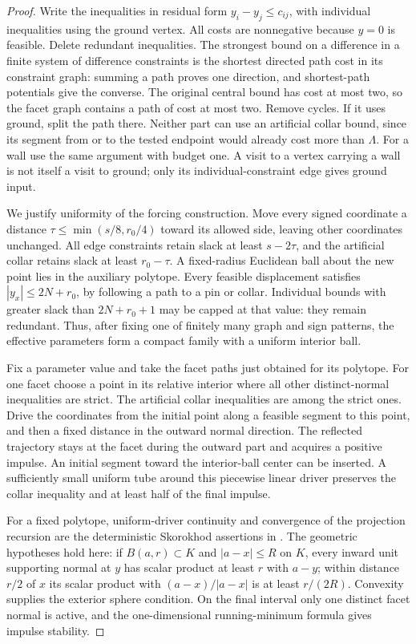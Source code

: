 \begin{proof}
Write the inequalities in residual form $y_i-y_j\le c_{ij}$, with
individual inequalities using the ground vertex. All costs are
nonnegative because $y=0$ is feasible. Delete redundant inequalities.
The strongest bound on a difference in a finite system of difference
constraints is the shortest directed path cost in its constraint graph:
summing a path proves one direction, and shortest-path potentials give
the converse. The original central bound has cost at most two, so the
facet graph contains a path of cost at most two. Remove cycles. If it
uses ground, split the path there. Neither part can use an artificial
collar bound, since its segment from or to the tested endpoint would
already cost more than $\Lambda$. For a wall use the same argument
with budget one. A visit to a vertex carrying a wall is not itself a
visit to ground; only its individual-constraint edge gives ground input.

We justify uniformity of the forcing construction. Move every signed
coordinate a distance $\tau\le\min(s/8,r_0/4)$ toward its allowed side,
leaving other coordinates unchanged. All edge constraints retain slack
at least $s-2\tau$, and the artificial collar retains slack at least
$r_0-\tau$. A fixed-radius Euclidean ball about the new point lies in
the auxiliary polytope. Every feasible displacement satisfies
$|y_x|\le2N+r_0$, by following a path to a pin or collar. Individual
bounds with greater slack than $2N+r_0+1$ may be capped at that value:
they remain redundant. Thus, after fixing one of finitely many graph
and sign patterns, the effective parameters form a compact family
with a uniform interior ball.

Fix a parameter value and take the facet paths just obtained for its
polytope. For one facet choose a point in its relative interior where
all other distinct-normal inequalities are strict. The artificial
collar inequalities are among the strict ones. Drive the coordinates
from the initial point along a feasible segment to this point, and
then a fixed distance in the outward normal direction. The reflected
trajectory stays at the facet during the outward part and acquires
a positive impulse. An initial segment toward the interior-ball
center can be inserted. A sufficiently small uniform tube around
this piecewise linear driver preserves the collar inequality and at
least half of the final impulse.

For a fixed polytope, uniform-driver continuity and convergence of the
projection recursion are the deterministic Skorokhod assertions in
\cite[Section 2, Corollaries 3--4]{Slominski}. The geometric hypotheses
hold here: if $B(a,r)\subset K$ and $|a-x|\le R$ on $K$, every inward
unit supporting normal at $y$ has scalar product at least $r$ with
$a-y$; within distance $r/2$ of $x$ its scalar product with
$(a-x)/|a-x|$ is at least $r/(2R)$. Convexity supplies the exterior
sphere condition. On the final interval only one distinct facet
normal is active, and the one-dimensional running-minimum formula
gives impulse stability.


\end{proof}
